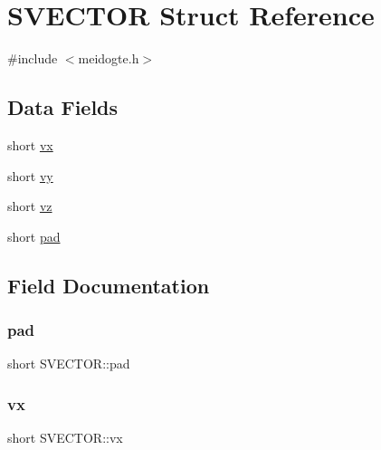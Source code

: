 \hypertarget{structSVECTOR}{}\section{S\+V\+E\+C\+T\+OR Struct Reference}
\label{structSVECTOR}


{\ttfamily \#include $<$meidogte.\+h$>$}

\subsection*{Data Fields}
\begin{DoxyCompactItemize}
\item 
short \hyperlink{structSVECTOR_a1e8916a8ffce68cc29bf1b56fba8cd67}{vx}
\item 
short \hyperlink{structSVECTOR_a031f59973d8777976fdc2c9adb373747}{vy}
\item 
short \hyperlink{structSVECTOR_a0432603c6d01420022208d0aae7fb68a}{vz}
\item 
short \hyperlink{structSVECTOR_a386c5c80985cb6b59e57a415617a609d}{pad}
\end{DoxyCompactItemize}


\subsection{Field Documentation}
\mbox{\label{structSVECTOR_a386c5c80985cb6b59e57a415617a609d}} 
\subsubsection{\texorpdfstring{pad}{pad}}
{\footnotesize\ttfamily short S\+V\+E\+C\+T\+O\+R\+::pad}

\mbox{\label{structSVECTOR_a1e8916a8ffce68cc29bf1b56fba8cd67}} 
\subsubsection{\texorpdfstring{vx}{vx}}
{\footnotesize\ttfamily short S\+V\+E\+C\+T\+O\+R\+::vx}

\mbox{\label{structSVECTOR_a031f59973d8777976fdc2c9adb373747}} 
